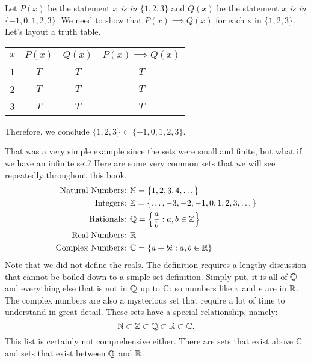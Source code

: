 \begin{example}{}
	Let $P(x)$ be the statement \textit{$x$ is in $\{1,2,3\}$} and $Q(x)$ be the statement \textit{$x$ is in $\{-1,0,1,2,3\}$}. We need to show that $P(x)\implies Q(x)$ for each x in $\{1,2,3\}$. Let's layout a truth table.
	\begin{center}
		\begin{tabular}{c | c | c | c}
			$x$ & $P(x)$ & $Q(x)$ & $P(x)\implies Q(x)$ \\
			\hline
			1   & $T$    & $T$    & $T$            \\
			2   & $T$    & $T$    & $T$            \\
			3   & $T$    & $T$    & $T$
		\end{tabular}
	\end{center}
	Therefore, we conclude $\{1,2,3\}\subset\{-1,0,1,2,3\}$.
\end{example}
That was a very simple example since the sets were small and finite, but what if we have an infinite set? Here are some very common sets that we will see repeatedly throughout this book.
\begin{align*}
	\text{Natural Numbers: } & \mathbb{N} = \{1,2,3,4,\dots\}                    \\
	\text{Integers: }        & \mathbb{Z} = \{\dots,-3,-2,-1,0,1,2,3,\dots\}     \\
	\text{Rationals: }       & \mathbb{Q} = \left\{\frac{a}{b}:a,b\in\mathbb{Z}\right\} \\
	\text{Real Numbers: }    & \mathbb{R}                                        \\
	\text{Complex Numbers: } & \mathbb{C} = \{a+bi : a,b\in\mathbb{R}\}
\end{align*}
Note that we did not define the reals. The definition requires a lengthy discussion that cannot be boiled down to a simple set definition. Simply put, it is all of $\mathbb{Q}$ and everything else that is not in $\mathbb{Q}$ up to $\mathbb{C}$; so numbers like $\pi$ and $e$ are in $\mathbb{R}$. The complex numbers are also a mysterious set that require a lot of time to understand in great detail. These sets have a special relationship, namely:
\[
	\mathbb{N}\subset\mathbb{Z}\subset\mathbb{Q}\subset\mathbb{R}\subset\mathbb{C}.
\]
This list is certainly not comprehensive either. There are sets that exist above $\mathbb{C}$ and sets that exist between $\mathbb{Q}$ and $\mathbb{R}$.

